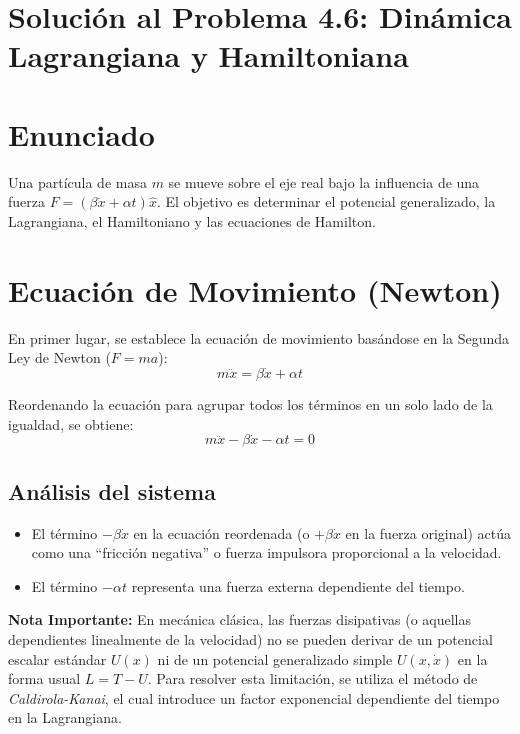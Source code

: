 \documentclass[12pt, a4paper]{article}
\begin{document}
\section{Solución al Problema 4.6: Dinámica Lagrangiana y Hamiltoniana}

\section*{Enunciado}
Una partícula de masa $m$ se mueve sobre el eje real bajo la influencia de una fuerza $F = (\beta\dot{x} + \alpha t)\hat{x}$. El objetivo es determinar el potencial generalizado, la Lagrangiana, el Hamiltoniano y las ecuaciones de Hamilton.

\section*{Ecuación de Movimiento (Newton)}

En primer lugar, se establece la ecuación de movimiento basándose en la Segunda Ley de Newton ($F = ma$):
\begin{equation}
    m\ddot{x} = \beta\dot{x} + \alpha t
\end{equation}

Reordenando la ecuación para agrupar todos los términos en un solo lado de la igualdad, se obtiene:
\begin{equation}
    m\ddot{x} - \beta\dot{x} - \alpha t = 0
    \label{eq:newton_zero}
\end{equation}

\subsection*{Análisis del sistema}
\begin{itemize}
    \item El término $-\beta\dot{x}$ en la ecuación reordenada (o $+\beta\dot{x}$ en la fuerza original) actúa como una ``fricción negativa'' o fuerza impulsora proporcional a la velocidad.
    \item El término $-\alpha t$ representa una fuerza externa dependiente del tiempo.
\end{itemize}

\textbf{Nota Importante:} En mecánica clásica, las fuerzas disipativas (o aquellas dependientes linealmente de la velocidad) no se pueden derivar de un potencial escalar estándar $U(x)$ ni de un potencial generalizado simple $U(x, \dot{x})$ en la forma usual $L=T-U$. Para resolver esta limitación, se utiliza el método de \textit{Caldirola-Kanai}, el cual introduce un factor exponencial dependiente del tiempo en la Lagrangiana.
\end{document}
